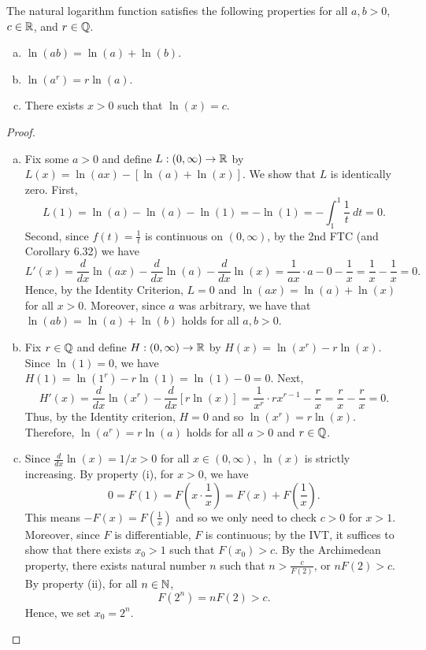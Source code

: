 \documentclass[letterpaper, twoside, 12pt]{book}
\begin{document}
\begin{theorem}[5.1]
  The natural logarithm function satisfies the following properties for
  all \(a,b>0\), \(c\in\mathbb R\), and \(r\in\mathbb Q\).
  \begin{enumerate}[(a)]
    \item \(\ln(ab)=\ln(a)+\ln(b)\).
    \item \(\ln(a^r)=r\ln(a)\).
    \item There exists \(x>0\) such that \(\ln(x)=c\).
  \end{enumerate}
\end{theorem}
\begin{proof}
  \begin{enumerate}[(a)]
    \item Fix some \(a > 0\) and define \(L: (0, \infty) \to \mathbb R\) by 
        \(L(x) = \ln(ax) - [\ln(a) + \ln(x)]\). We show that \(L\) is identically
        zero. First, 
        \[ L(1) = \ln(a) - \ln(a) - \ln(1) = -\ln(1) = - \int_1^1 \frac{1}{t} ~dt = 0 .\]
        Second, since \(f(t) = \frac{1}{t}\) is continuous on \((0, \infty)\), 
        by the 2nd FTC (and Corollary 6.32) we have
        \[ L'(x) = \frac{d}{dx} \ln(ax) - \frac{d}{dx} \ln(a) - \frac{d}{dx} \ln(x) = 
        \frac{1}{ax} \cdot a - 0 - \frac{1}{x} = \frac{1}{x} - \frac{1}{x} = 0 .\]
        Hence, by the Identity Criterion, \(L = 0\) and
        \(\ln(ax) = \ln(a) + \ln(x)\) for all \(x > 0\). Moreover, since \(a\) was 
        arbitrary, we have that \(\ln(ab) = \ln(a) + \ln(b)\) holds for all \(a, b > 0\).
    \item Fix \(r \in \mathbb Q\) and define \(H: (0, \infty) \to \mathbb R\) by
        \(H(x) = \ln(x^r) - r\ln(x) \). Since \(\ln(1) = 0\), we have
        \(H(1) = \ln(1^r) - r\ln(1) = \ln(1) - 0 = 0 \). Next, 
        \[ H'(x) = \frac{d}{dx} \ln(x^r) - \frac{d}{dx} [r \ln(x)] = 
        \frac{1}{x^r} \cdot r x^{r-1} - \frac{r}{x} = \frac{r}{x} - \frac{r}{x} = 0 .\]
        Thus, by the Identity criterion, \(H = 0\) and so
        \(\ln(x^r) = r \ln(x)\). Therefore, \(\ln(a^r) = r\ln(a)\) holds for
        all \(a > 0\) and \(r \in \mathbb Q\).
    \item Since \(\frac{d}{dx} \ln(x) = 1/x > 0\) for all \(x \in (0, \infty)\), 
        \(\ln(x)\) is strictly increasing. By property (i), for \(x > 0\), we have
        \[ 0 = F(1) = F(x \cdot \frac{1}{x}) = F(x) + F(\frac{1}{x}) .\]
        This means \(-F(x) = F(\frac{1}{x})\) and so we only need to check \(c > 0\)
        for \(x > 1\). Moreover, since \(F\) is differentiable, \(F\) is continuous;
        by the IVT, it suffices to show that there exists \(x_0 > 1\) such that
        \(F(x_0) > c\). By the Archimedean property, there exists natural number
        \(n\) such that \(n > \frac{c}{F(2)}\), or \(nF(2) > c\). By property 
        (ii), for all \(n \in \mathbb N\),
        \[ F(2^n) = nF(2) > c .\]
        Hence, we set \(x_0 = 2^n\). 
  \end{enumerate}
\end{proof}
\end{document}
